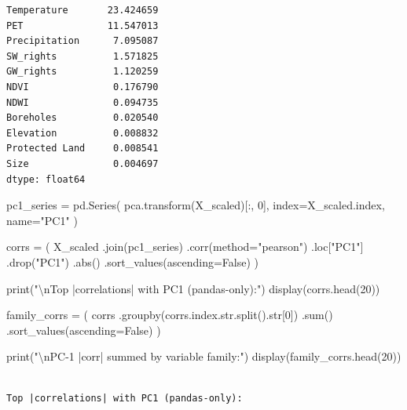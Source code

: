 \documentclass[
  letterpaper,
  DIV=11,
  numbers=noendperiod]{scrreprt}
\newenvironment{Shaded}{\begin{snugshade}}{\end{snugshade}}
\newcommand{\BuiltInTok}[1]{\textcolor[rgb]{0.00,0.23,0.31}{#1}}
\newcommand{\CharTok}[1]{\textcolor[rgb]{0.13,0.47,0.30}{#1}}
\newcommand{\DecValTok}[1]{\textcolor[rgb]{0.68,0.00,0.00}{#1}}
\newcommand{\NormalTok}[1]{\textcolor[rgb]{0.00,0.23,0.31}{#1}}
\newcommand{\OperatorTok}[1]{\textcolor[rgb]{0.37,0.37,0.37}{#1}}
\newcommand{\StringTok}[1]{\textcolor[rgb]{0.13,0.47,0.30}{#1}}
\newcommand{\VariableTok}[1]{\textcolor[rgb]{0.07,0.07,0.07}{#1}}
\begin{document}
\begin{verbatim}
Temperature       23.424659
PET               11.547013
Precipitation      7.095087
SW_rights          1.571825
GW_rights          1.120259
NDVI               0.176790
NDWI               0.094735
Boreholes          0.020540
Elevation          0.008832
Protected Land     0.008541
Size               0.004697
dtype: float64
\end{verbatim}

\begin{Shaded}
\begin{Highlighting}[]
\NormalTok{pc1\_series }\OperatorTok{=}\NormalTok{ pd.Series(}
\NormalTok{    pca.transform(X\_scaled)[:, }\DecValTok{0}\NormalTok{],}
\NormalTok{    index}\OperatorTok{=}\NormalTok{X\_scaled.index,}
\NormalTok{    name}\OperatorTok{=}\StringTok{"PC1"}
\NormalTok{)}

\NormalTok{corrs }\OperatorTok{=}\NormalTok{ (}
\NormalTok{    X\_scaled}
\NormalTok{        .join(pc1\_series) }
\NormalTok{        .corr(method}\OperatorTok{=}\StringTok{"pearson"}\NormalTok{)}
\NormalTok{        .loc[}\StringTok{"PC1"}\NormalTok{]}
\NormalTok{        .drop(}\StringTok{"PC1"}\NormalTok{)}
\NormalTok{        .}\BuiltInTok{abs}\NormalTok{()}
\NormalTok{        .sort\_values(ascending}\OperatorTok{=}\VariableTok{False}\NormalTok{)}
\NormalTok{)}

\BuiltInTok{print}\NormalTok{(}\StringTok{"}\CharTok{\textbackslash{}n}\StringTok{Top |correlations| with PC1 (pandas{-}only):"}\NormalTok{)}
\NormalTok{display(corrs.head(}\DecValTok{20}\NormalTok{))}

\NormalTok{family\_corrs }\OperatorTok{=}\NormalTok{ (}
\NormalTok{    corrs}
\NormalTok{      .groupby(corrs.index.}\BuiltInTok{str}\NormalTok{.split().}\BuiltInTok{str}\NormalTok{[}\DecValTok{0}\NormalTok{])}
\NormalTok{      .}\BuiltInTok{sum}\NormalTok{()}
\NormalTok{      .sort\_values(ascending}\OperatorTok{=}\VariableTok{False}\NormalTok{)}
\NormalTok{)}

\BuiltInTok{print}\NormalTok{(}\StringTok{"}\CharTok{\textbackslash{}n}\StringTok{PC{-}1 |corr| summed by variable family:"}\NormalTok{)}
\NormalTok{display(family\_corrs.head(}\DecValTok{20}\NormalTok{))}
\end{Highlighting}
\end{Shaded}

\begin{verbatim}

Top |correlations| with PC1 (pandas-only):
\end{verbatim}
\end{document}
